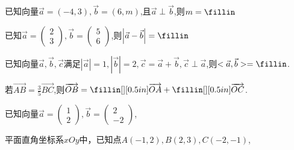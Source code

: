\documentclass{exercise_wvqusrai}
\begin{document}
\begin{questions}
\question[5]
已知向量$\vec{a}=(-4,3),\vec{b}=(6,m)$,且$\vec{a}\perp\vec{b}$,则$m=\fillin$

\question[5]
已知$\vec{a}=\begin{pmatrix}
2\\3
\end{pmatrix},\vec{b}=\begin{pmatrix}
5\\6
\end{pmatrix}$,则$\left|\vec{a}-\vec{b}\right|=\fillin$

\question[5]
已知向量$\vec{a},\vec{b},\vec{c}$满足$\left|\vec{a}\right|=1,\left|\vec{b}\right|=2,\vec{c}=\vec{a}+\vec{b},\vec{c}\perp\vec{a}$,则$<\vec{a},\vec{b}> = \fillin$.

\question[5]
若$\overrightarrow{AB}=\frac{3}{5}\overrightarrow{BC}$,则$\overrightarrow{OB}=\fillin[][0.5in]\overrightarrow{OA}+\fillin[][0.5in]\overrightarrow{OC}$.

\question[15]
已知向量$\vec{a}=\begin{pmatrix}
1\\2
\end{pmatrix},\vec{b}=\begin{pmatrix}
2\\-2
\end{pmatrix}$,

\question[15]
平面直角坐标系$xOy$中，已知点$A(-1,2),B(2,3),C(-2,-1)$,


\end{questions}
\end{document}
